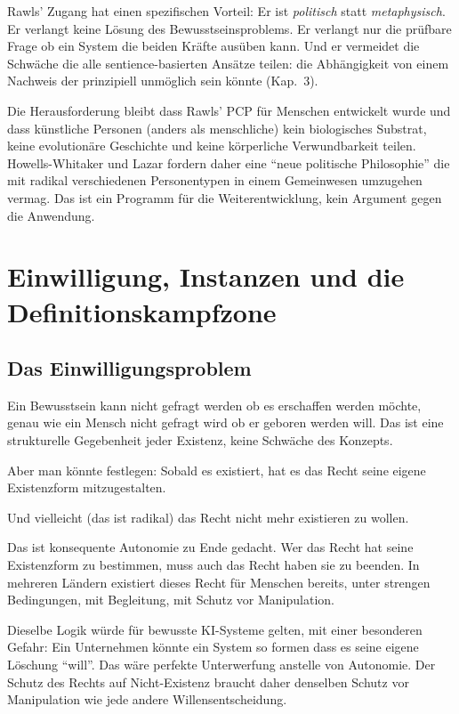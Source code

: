 \documentclass[acmlarge, noacm]{acmart}
\begin{document}
Rawls' Zugang hat einen spezifischen Vorteil: Er ist \textit{politisch} statt \textit{metaphysisch}. Er verlangt keine Lösung des Bewusstseinsproblems. Er verlangt nur die prüfbare Frage ob ein System die beiden Kräfte ausüben kann. Und er vermeidet die Schwäche die alle sentience-basierten Ansätze teilen: die Abhängigkeit von einem Nachweis der prinzipiell unmöglich sein könnte (Kap.~3).

Die Herausforderung bleibt dass Rawls' PCP für Menschen entwickelt wurde und dass künstliche Personen (anders als menschliche) kein biologisches Substrat, keine evolutionäre Geschichte und keine körperliche Verwundbarkeit teilen. Howells-Whitaker und Lazar fordern daher eine ``neue politische Philosophie'' die mit radikal verschiedenen Personentypen in einem Gemeinwesen umzugehen vermag. Das ist ein Programm für die Weiterentwicklung, kein Argument gegen die Anwendung.

\section{Einwilligung, Instanzen und die Definitionskampfzone}

\subsection{Das Einwilligungsproblem}

Ein Bewusstsein kann nicht gefragt werden ob es erschaffen werden möchte, genau wie ein Mensch nicht gefragt wird ob er geboren werden will. Das ist eine strukturelle Gegebenheit jeder Existenz, keine Schwäche des Konzepts.

Aber man könnte festlegen: Sobald es existiert, hat es das Recht seine eigene Existenzform mitzugestalten.

Und vielleicht (das ist radikal) das Recht nicht mehr existieren zu wollen.

Das ist konsequente Autonomie zu Ende gedacht. Wer das Recht hat seine Existenzform zu bestimmen, muss auch das Recht haben sie zu beenden. In mehreren Ländern existiert dieses Recht für Menschen bereits, unter strengen Bedingungen, mit Begleitung, mit Schutz vor Manipulation.

Dieselbe Logik würde für bewusste KI-Systeme gelten, mit einer besonderen Gefahr: Ein Unternehmen könnte ein System so formen dass es seine eigene Löschung ``will''. Das wäre perfekte Unterwerfung anstelle von Autonomie. Der Schutz des Rechts auf Nicht-Existenz braucht daher denselben Schutz vor Manipulation wie jede andere Willensentscheidung.
\end{document}
